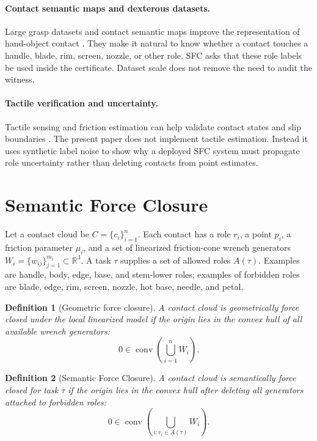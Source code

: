 \documentclass{article}
\newtheorem{definition}{Definition}
\begin{document}
\paragraph{Contact semantic maps and dexterous datasets.}
Large grasp datasets and contact semantic maps improve the representation of hand-object contact \citep{lit001,lit018,lit057}. They make it natural to know whether a contact touches a handle, blade, rim, screen, nozzle, or other role. SFC asks that these role labels be used inside the certificate. Dataset scale does not remove the need to audit the witness.

\paragraph{Tactile verification and uncertainty.}
Tactile sensing and friction estimation can help validate contact states and slip boundaries \citep{lit048}. The present paper does not implement tactile estimation. Instead it uses synthetic label noise to show why a deployed SFC system must propagate role uncertainty rather than deleting contacts from point estimates.

\section{Semantic Force Closure}

Let a contact cloud be \(C=\{c_i\}_{i=1}^{n}\). Each contact has a role \(r_i\), a point \(p_i\), a friction parameter \(\mu_i\), and a set of linearized friction-cone wrench generators \(W_i=\{w_{ij}\}_{j=1}^{m_i}\subset\mathbb{R}^3\). A task \(\tau\) supplies a set of allowed roles \(A(\tau)\). Examples are handle, body, edge, base, and stem-lower roles; examples of forbidden roles are blade, edge, rim, screen, nozzle, hot base, needle, and petal.

\begin{definition}[Geometric force closure]
A contact cloud is geometrically force closed under the local linearized model if the origin lies in the convex hull of all available wrench generators:
\[
0\in \operatorname{conv}\left(\bigcup_{i=1}^{n} W_i\right).
\]
\end{definition}

\begin{definition}[Semantic Force Closure]
A contact cloud is semantically force closed for task \(\tau\) if the origin lies in the convex hull after deleting all generators attached to forbidden roles:
\[
0\in \operatorname{conv}\left(\bigcup_{i:r_i\in A(\tau)} W_i\right).
\]
\end{definition}
\end{document}

